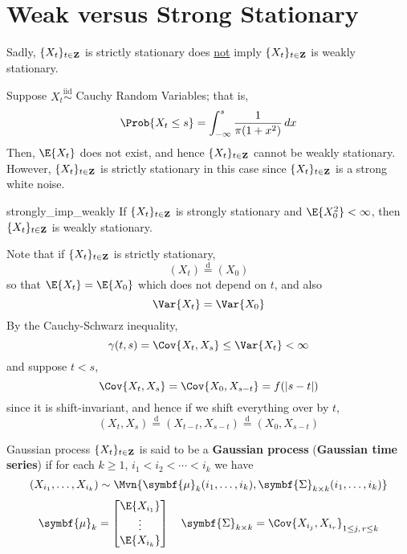 \section{Weak versus Strong Stationary}
Sadly, $ \{X_t\}_{t\in\mathbf{Z}} $ is strictly stationary does \underline{not} imply
$ \{X_t\}_{t\in\mathbf{Z}} $ is weakly stationary.
\begin{Example}{}{}
    Suppose $ X_t\stackrel{\text{iid}}{\sim} $ Cauchy Random Variables;
    that is,
    \[ \Prob{X_t\le s}=\int_{-\infty}^{s} \frac{1}{\pi(1+x^2)}\, d{x}  \]
    Then, $ \E{X_t} $ does not exist, and hence $ \{X_t\}_{t\in\mathbf{Z}} $ cannot
    be weakly stationary. However, $ \{X_t\}_{t\in\mathbf{Z}} $ is strictly
    stationary in this case since $ \{X_t\}_{t\in\mathbf{Z}} $ is a strong
    white noise.
\end{Example}
\begin{Theorem}{}{strongly_imp_weakly}
    If $ \{X_t\}_{t\in\mathbf{Z}} $ is strongly stationary and $ \E{X_0^2}<\infty $,
    then $ \{X_t\}_{t\in\mathbf{Z}} $ is weakly stationary.
\end{Theorem}
\begin{Proof}{}{}
    Note that if $ \{X_t\}_{t\in\mathbf{Z}} $ is strictly stationary,
    \[ (X_t)\stackrel{\text{d}}{=}(X_0) \]
    so that $ \E{X_t}=\E{X_0} $ which does not depend on $ t $, and also
    \[ \Var{X_t}=\Var{X_0} \]
    By the Cauchy-Schwarz inequality,
    \[ \gamma(t,s)=\Cov{X_t,X_s}\le \Var{X_t}<\infty \]
    and suppose $ t<s $,
    \[ \Cov{X_t,X_s}=\Cov{X_0,X_{s-t}}=f(\abs{s-t}) \]
    since it is shift-invariant, and hence if we shift everything over by $ t $,
    \[ (X_t,X_s)\stackrel{\text{d}}{=}(X_{t-t},X_{s-t})\stackrel{\text{d}}{=}(X_0,X_{s-t}) \]
\end{Proof}
\begin{Definition}{Gaussian process}{}
    $ \{X_t\}_{t\in\mathbf{Z}} $ is said to be a
    \textbf{Gaussian process} (\textbf{Gaussian time series}) if
    for each $ k\ge 1 $, $ i_1<i_2<\cdots<i_k $ we have
    \[ (X_{i_1},\ldots,X_{i_k})\sim
        \Mvn{\symbf{\mu}_k(i_1,\ldots,i_k),\symbf{\Sigma}_{k\times k}(i_1,\ldots,i_k)} \]
    \[ \symbf{\mu}_k=\begin{bmatrix}
            \E{X_{i_1}} \\
            \vdots      \\
            \E{X_{i_k}}
        \end{bmatrix}\quad
        \symbf{\Sigma}_{k\times k}=
        \Cov{X_{i_j},X_{i_r}}_{1\le j,\, r\le k} \]
\end{Definition}
